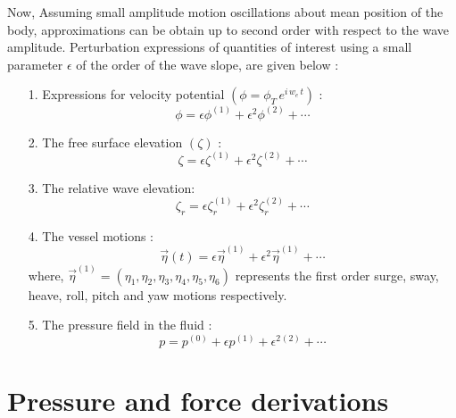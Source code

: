 Now, Assuming small amplitude motion oscillations about mean position of the body, approximations can be obtain 
up to second order with respect to the wave amplitude. Perturbation expressions of quantities 
of interest using a small parameter $\epsilon$ of the order of the wave slope, are given below :

\begin{itemize}
    \item [1.] Expressions for velocity potential $\left(\phi = \phi_T\,e^{i\,w_e\,t}\right)$ :
    \begin{equation}
        \phi = \epsilon \phi^{(1)} + \epsilon^2 \phi^{(2)} + \cdots
    \end{equation}

    \item [2.] The free surface elevation $(\zeta)$ :
    \begin{equation}
        \zeta = \epsilon \zeta^{(1)} + \epsilon^2 \zeta^{(2)} + \cdots
    \end{equation}

    \item [3.] The relative wave elevation:
    \begin{equation}
        \zeta_r = \epsilon \zeta_r^{(1)} + \epsilon^2 \zeta_r^{(2)} + \cdots
    \end{equation}

    \item [4.] The vessel motions :
    \begin{equation}
        \vec{\eta}(t) = \epsilon \vec{\eta}^{(1)} + \epsilon^2 \vec{\eta}^{(1)} + \cdots
    \end{equation}
    where, $\vec{\eta}^{(1)} = (\eta_1, \eta_2, \eta_3, \eta_4, \eta_5, \eta_6)$ represents the first order surge, 
    sway, heave, roll, pitch and yaw motions respectively.

    \item [5.] The pressure field in the fluid :
    \begin{equation}
        \label{eq:per_perssure}
        p = p^{(0)} + \epsilon p^{(1)} + \epsilon^{2} {^{(2)}} + \cdots
    \end{equation}
\end{itemize}



\section{Pressure and force derivations}


